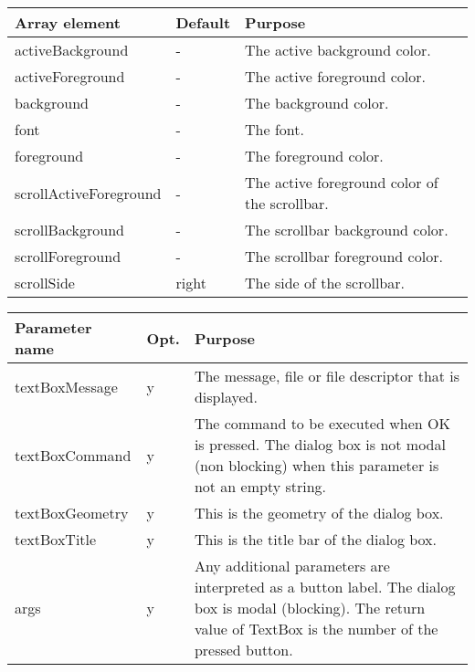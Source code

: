 {\newpage
\clearpage
\samepage \begin{tabular}{|l|l|p{5.5cm}|} \hline
Array element          & Default & Purpose \\  \hline
activeBackground       & -       & The active background
                                   color. \\  \hline
activeForeground       & -       & The active foreground
                                   color. \\  \hline
background             & -       & The background color. \\  \hline
font                   & -       & The font. \\  \hline
foreground             & -       & The foreground color. \\  \hline
scrollActiveForeground & -       & The active foreground
                                   color of the scrollbar.\\  \hline
scrollBackground       & -       & The scrollbar background
                                   color. \\  \hline
scrollForeground       & -       & The scrollbar foreground
                                   color. \\  \hline
scrollSide             & right   & The side of the
                                   scrollbar. \\  \hline
\end{tabular}
}

{\newpage
\clearpage
\samepage \begin{figure}[ht]
  \centerline{
  \epsfysize=4cm
  }

  \label{fig:ReadBox}
\end{figure}
}

{\newpage
\clearpage
\samepage \begin{tabular}{|l|l|p{6.5cm}|} \hline
Parameter name  & Opt. & Purpose\\  \hline
textBoxMessage  & y    & The message, file or file
                         descriptor that is displayed.\\  \hline
textBoxCommand  & y    & The command to be executed when OK
                         is pressed. The dialog box is not
                         modal (non blocking) when this
                         parameter is not an empty
                         string.\\  \hline
textBoxGeometry & y    & This is the geometry of the dialog
                         box.\\  \hline
textBoxTitle    & y    & This is the title bar of the dialog
                         box.\\  \hline
args            & y    & Any additional parameters are
                         interpreted as a button label. The
                         dialog box is modal (blocking).
                         The return value of TextBox
                         is the number of the pressed
                         button.\\  \hline
\end{tabular}
}

